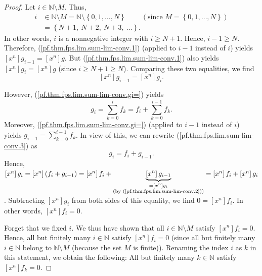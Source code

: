 \begin{fineprint}
\begin{proof}
Let $i\in\mathbb{N}\setminus M$. Thus,
\begin{align*}
i  &  \in\mathbb{N}\setminus M=\mathbb{N}\setminus\left\{  0,1,\ldots
,N\right\}  \ \ \ \ \ \ \ \ \ \ \left(  \text{since }M=\left\{  0,1,\ldots
,N\right\}  \right) \\
&  =\left\{  N+1,\ N+2,\ N+3,\ \ldots\right\}  .
\end{align*}
In other words, $i$ is a nonnegative integer with $i\geq N+1$. Hence, $i-1\geq
N$. Therefore, (\ref{pf.thm.fps.lim.sum-lim-conv.1}) (applied to $i-1$ instead
of $i$) yields $\left[  x^{n}\right]  g_{i-1}=\left[  x^{n}\right]  g$. But
(\ref{pf.thm.fps.lim.sum-lim-conv.1}) also yields $\left[  x^{n}\right]
g_{i}=\left[  x^{n}\right]  g$ (since $i\geq N+1\geq N$). Comparing these two
equalities, we find
\begin{equation}
\left[  x^{n}\right]  g_{i-1}=\left[  x^{n}\right]  g_{i}.
\label{pf.thm.fps.lim.sum-lim-conv.2}%
\end{equation}


However, (\ref{pf.thm.fps.lim.sum-lim-conv.gi=}) yields
\begin{equation}
g_{i}=\sum_{k=0}^{i}f_{k}=f_{i}+\sum_{k=0}^{i-1}f_{k}.
\label{pf.thm.fps.lim.sum-lim-conv.3}%
\end{equation}
Moreover, (\ref{pf.thm.fps.lim.sum-lim-conv.gi=}) (applied to $i-1$ instead of
$i$) yields $g_{i-1}=\sum_{k=0}^{i-1}f_{k}$. In view of this, we can rewrite
(\ref{pf.thm.fps.lim.sum-lim-conv.3}) as%
\[
g_{i}=f_{i}+g_{i-1}.
\]
Hence, $\left[  x^{n}\right]  g_{i}=\left[  x^{n}\right]  \left(
f_{i}+g_{i-1}\right)  =\left[  x^{n}\right]  f_{i}+\underbrace{\left[
x^{n}\right]  g_{i-1}}_{\substack{=\left[  x^{n}\right]  g_{i}\\\text{(by
(\ref{pf.thm.fps.lim.sum-lim-conv.2}))}}}=\left[  x^{n}\right]  f_{i}+\left[
x^{n}\right]  g_{i}$. Subtracting $\left[  x^{n}\right]  g_{i}$ from both
sides of this equality, we find $0=\left[  x^{n}\right]  f_{i}$. In other
words, $\left[  x^{n}\right]  f_{i}=0$.

Forget that we fixed $i$. We thus have shown that all $i\in\mathbb{N}\setminus
M$ satisfy $\left[  x^{n}\right]  f_{i}=0$. Hence, all but finitely many
$i\in\mathbb{N}$ satisfy $\left[  x^{n}\right]  f_{i}=0$ (since all but
finitely many $i\in\mathbb{N}$ belong to $\mathbb{N}\setminus M$ (because the
set $M$ is finite)). Renaming the index $i$ as $k$ in this statement, we
obtain the following: All but finitely many $k\in\mathbb{N}$ satisfy $\left[
x^{n}\right]  f_{k}=0$.


\end{proof}
\end{fineprint}
